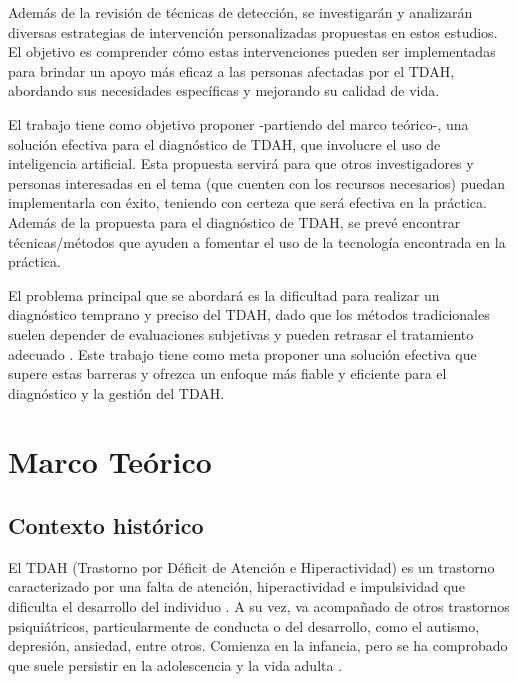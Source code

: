 \documentclass[10pt,journal,compsoc]{IEEEtran}
\begin{document}
Además de la revisión de técnicas de detección, se investigarán y analizarán diversas estrategias de intervención personalizadas propuestas en estos estudios. El objetivo es comprender cómo estas intervenciones pueden ser implementadas para brindar un apoyo más eficaz a las personas afectadas por el TDAH, abordando sus necesidades específicas y mejorando su calidad de vida.

El trabajo tiene como objetivo proponer -partiendo del marco teórico-, una solución efectiva para el diagnóstico de TDAH, que involucre el uso de inteligencia artificial. Esta propuesta servirá para que otros investigadores y personas interesadas en el tema (que cuenten con los recursos necesarios) puedan implementarla con éxito, teniendo con certeza que será efectiva en la práctica. Además de la propuesta para el diagnóstico de TDAH, se prevé encontrar técnicas/métodos que ayuden a fomentar el uso de la tecnología encontrada en la práctica.

El problema principal que se abordará es la dificultad para realizar un diagnóstico temprano y preciso del TDAH, dado que los métodos tradicionales suelen depender de evaluaciones subjetivas y pueden retrasar el tratamiento adecuado \cite{khullar2021deep}. Este trabajo tiene como meta proponer una solución efectiva que supere estas barreras y ofrezca un enfoque más fiable y eficiente para el diagnóstico y la gestión del TDAH.

\section{Marco Teórico}
\subsection{Contexto histórico}
El TDAH (Trastorno por Déficit de Atención e Hiperactividad) es un trastorno caracterizado por una falta de atención, hiperactividad e impulsividad que dificulta el desarrollo del individuo \cite{thapar2008overview}. A su vez, va acompañado de otros trastornos psiquiátricos, particularmente de conducta o del desarrollo, como el autismo, depresión, ansiedad, entre otros. Comienza en la infancia, pero se ha comprobado que suele persistir en la adolescencia y la vida adulta \cite{combs2015perceived}. 
\end{document}
